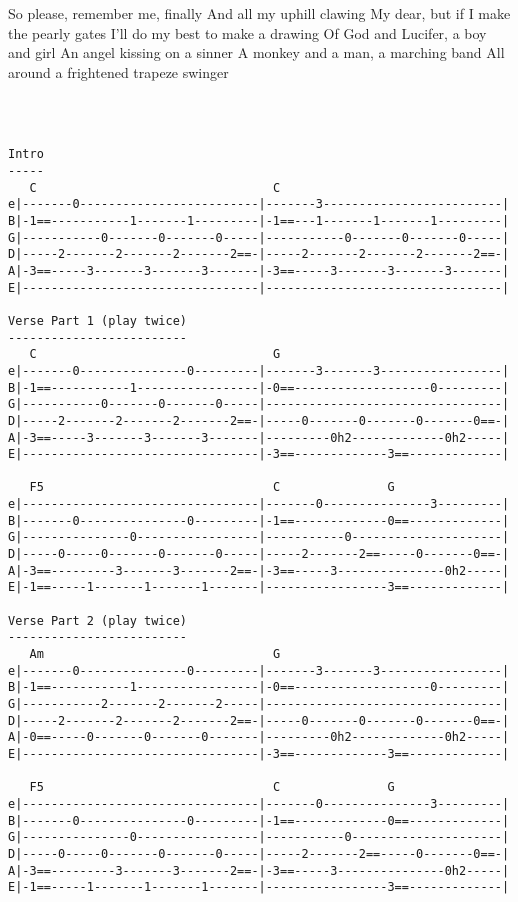 So please, remember me, finally
And all my uphill clawing
My dear, but if I make the pearly gates
I'll do my best to make a drawing
Of God and Lucifer, a boy and girl
An angel kissing on a sinner
A monkey and a man, a marching band
All around a frightened trapeze swinger
\Next%
\Tab%
\begin{verbatim}



Intro
-----
   C                                 C
e|-------0-------------------------|-------3-------------------------|
B|-1==-----------1-------1---------|-1==---1-------1-------1---------|
G|-----------0-------0-------0-----|-----------0-------0-------0-----|
D|-----2-------2-------2-------2==-|-----2-------2-------2-------2==-|
A|-3==-----3-------3-------3-------|-3==-----3-------3-------3-------|
E|---------------------------------|---------------------------------|

Verse Part 1 (play twice)
-------------------------
   C                                 G
e|-------0---------------0---------|-------3-------3-----------------|
B|-1==-----------1-----------------|-0==-------------------0---------|
G|-----------0-------0-------0-----|---------------------------------|
D|-----2-------2-------2-------2==-|-----0-------0-------0-------0==-|
A|-3==-----3-------3-------3-------|---------0h2-------------0h2-----|
E|---------------------------------|-3==-------------3==-------------|

   F5                                C               G
e|---------------------------------|-------0---------------3---------|
B|-------0---------------0---------|-1==-------------0==-------------|
G|---------------0-----------------|-----------0---------------------|
D|-----0-----0-------0-------0-----|-----2-------2==-----0-------0==-|
A|-3==---------3-------3-------2==-|-3==-----3---------------0h2-----|
E|-1==-----1-------1-------1-------|-----------------3==-------------|

Verse Part 2 (play twice)
-------------------------
   Am                                G
e|-------0---------------0---------|-------3-------3-----------------|
B|-1==-----------1-----------------|-0==-------------------0---------|
G|-----------2-------2-------2-----|---------------------------------|
D|-----2-------2-------2-------2==-|-----0-------0-------0-------0==-|
A|-0==-----0-------0-------0-------|---------0h2-------------0h2-----|
E|---------------------------------|-3==-------------3==-------------|

   F5                                C               G
e|---------------------------------|-------0---------------3---------|
B|-------0---------------0---------|-1==-------------0==-------------|
G|---------------0-----------------|-----------0---------------------|
D|-----0-----0-------0-------0-----|-----2-------2==-----0-------0==-|
A|-3==---------3-------3-------2==-|-3==-----3---------------0h2-----|
E|-1==-----1-------1-------1-------|-----------------3==-------------|
\end{verbatim}
\Next
\vfil
\Next
